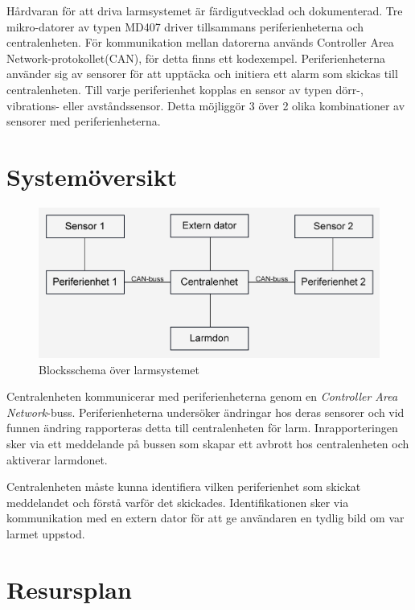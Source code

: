 \documentclass[a4paper]{article}
\begin{document}
Hårdvaran för att driva larmsystemet är färdigutvecklad och dokumenterad. Tre mikro-datorer av typen MD407 driver tillsammans periferienheterna och centralenheten. För kommunikation mellan datorerna används Controller Area Network-protokollet(CAN), för detta finns ett kodexempel. Periferienheterna använder sig av sensorer för att upptäcka och initiera ett alarm som skickas till centralenheten. Till varje periferienhet kopplas en sensor av typen dörr-, vibrations- eller avståndssensor. Detta möjliggör 3 över 2 olika kombinationer av sensorer med periferienheterna.


\section{Systemöversikt}

\begin{figure}[H]
    \centering
    \includegraphics[width=\textwidth]{blockschema.png}
    \caption{Blocksschema över larmsystemet}
\end{figure}

Centralenheten kommunicerar med periferienheterna genom en \textit{Controller Area Network}-buss. Periferienheterna undersöker ändringar hos deras sensorer och vid funnen ändring rapporteras detta till centralenheten för larm. Inrapporteringen sker via ett meddelande på bussen som skapar ett avbrott hos centralenheten och aktiverar larmdonet.

Centralenheten måste kunna identifiera vilken periferienhet som skickat meddelandet och förstå varför det skickades. Identifikationen sker via kommunikation med en extern dator för att ge användaren en tydlig bild om var larmet uppstod.

\section{Resursplan}
\end{document}
